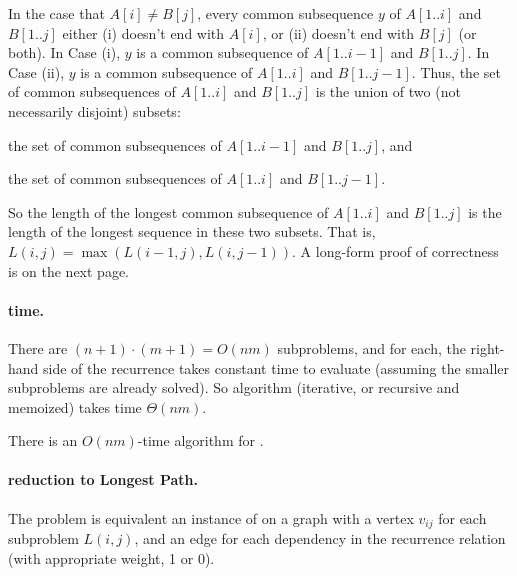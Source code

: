 In the case that $A[i] \ne B[j]$,
every common subsequence $y$ of $A[1..i]$ and $B[1..j]$
either (i) doesn't end with $A[i]$, or (ii) doesn't end with $B[j]$ (or both).
In Case (i), $y$ is a common subsequence of $A[1..i-1]$ and $B[1..j]$.  
In Case (ii), $y$ is a common subsequence of $A[1..i]$ and $B[1..j-1]$.  
Thus, the set of common subsequences of $A[1..i]$ and $B[1..j]$
is the union of two (not necessarily disjoint) subsets:
\begin{mylist}
\item[(i)] the set of common subsequences of $A[1..i-1]$ and $B[1..j]$, and 
\item[(ii)] the set of common subsequences of $A[1..i]$ and $B[1..j-1]$.
\end{mylist}
So the length of the longest common subsequence of $A[1..i]$ and $B[1..j]$
is the length of the longest sequence in these two subsets.
That is, $L(i,j) = \max(L(i-1, j), L(i, j-1))$.
A long-form proof of correctness is on the next page.

\paragraph{time.}
There are $(n+1)\cdot(m+1) = O(nm)$ subproblems,
and for each, the right-hand side of the recurrence takes
constant time to evaluate
(assuming the smaller subproblems are already solved).
So algorithm (iterative, or recursive and memoized)
takes time $\Theta(nm)$.

\begin{theorem}
  There is an $O(nm)$-time algorithm for .
\end{theorem}

\paragraph{reduction to Longest Path.}
The problem is equivalent an instance of 
on a graph with a vertex $v_{ij}$ for each subproblem $L(i,j)$,
and an edge for each dependency in the recurrence relation
(with appropriate weight, 1 or 0).




